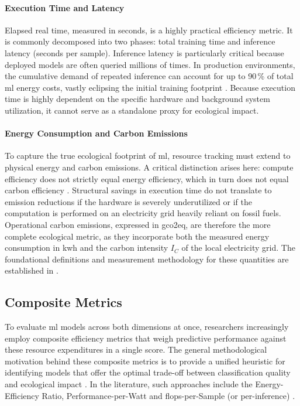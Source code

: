\paragraph{Execution Time and Latency}
Elapsed real time, measured in seconds, is a highly practical efficiency metric. It is commonly decomposed into two phases: total training time and inference latency (seconds per sample). Inference latency is particularly critical because deployed models are often queried millions of times. In production environments, the cumulative demand of repeated inference can account for up to 90\,\% of total \gls{ml} energy costs, vastly eclipsing the initial training footprint \parencite{desislavovTrendsAIInference2023}. Because execution time is highly dependent on the specific hardware and background system utilization, it cannot serve as a standalone proxy for ecological impact.

\paragraph{Energy Consumption and Carbon Emissions}
To capture the true ecological footprint of \gls{ml}, resource tracking must extend to physical energy and carbon emissions. A critical distinction arises here: compute efficiency does not strictly equal energy efficiency, which in turn does not equal carbon efficiency \parencite{wrightEfficiencyNotEnough2025}. Structural savings in execution time do not translate to emission reductions if the hardware is severely underutilized or if the computation is performed on an electricity grid heavily reliant on fossil fuels. Operational carbon emissions, expressed in \gls{gco2eq}, are therefore the more complete ecological metric, as they incorporate both the measured energy consumption in \gls{kwh} and the carbon intensity $I_C$ of the local electricity grid. The foundational definitions and measurement methodology for these quantities are established in .

\subsection{Composite Metrics}

To evaluate \gls{ml} models across both dimensions at once, researchers increasingly employ composite efficiency metrics that weigh predictive performance against these resource expenditures in a single score. The general methodological motivation behind these composite metrics is to provide a unified heuristic for identifying models that offer the optimal trade-off between classification quality and ecological impact \parencite{schwartzGreenAI2020}. In the literature, such approaches include the Energy-Efficiency Ratio, Performance-per-Watt \parencite{desislavovTrendsAIInference2023} and \glspl{flop}-per-Sample (or per-inference) \parencite{schwartzGreenAI2020}.

